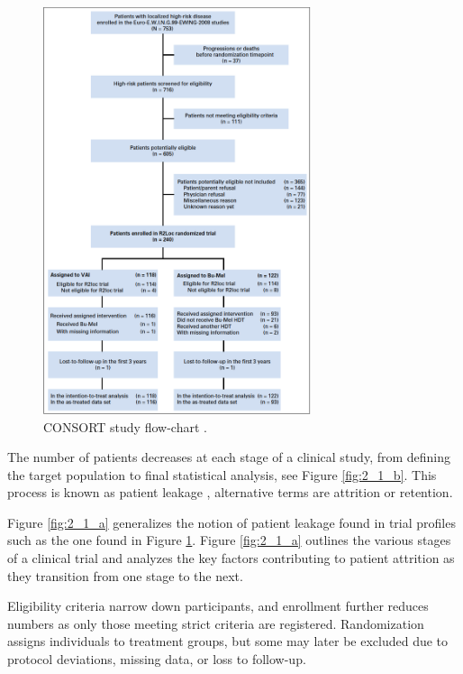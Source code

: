 \begin{figure}[h]
  \centering
  \includegraphics[width=0.7\textwidth]{whelan_flow.png}
  \caption{CONSORT study flow-chart \citep{whelan2018high, schulz2010consort}.}
  \label{fig:2_0}
\end{figure}

The number of patients decreases at each stage of a clinical study, from defining the target population to final statistical analysis, see Figure \ref{fig:2_1_b}. This process is known as patient leakage \citep{desai2014preventing}, alternative terms are attrition or retention.

Figure \ref{fig:2_1_a} generalizes the notion of patient leakage found in trial profiles such as the one found in Figure \ref{fig:2_0}. Figure \ref{fig:2_1_a} outlines the various stages of a clinical trial and analyzes the key factors contributing to patient attrition as they transition from one stage to the next.

Eligibility criteria narrow down participants, and enrollment further reduces numbers as only those meeting strict criteria are registered. Randomization assigns individuals to treatment groups, but some may later be excluded due to protocol deviations, missing data, or loss to follow-up. 


